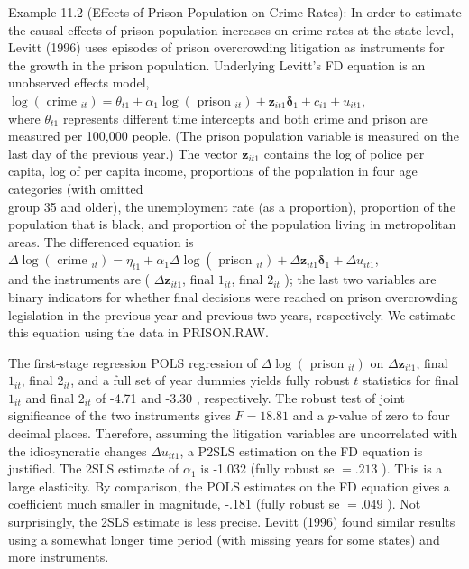 \documentclass[10pt]{article}
\begin{document}
Example 11.2 (Effects of Prison Population on Crime Rates): In order to estimate the causal effects of prison population increases on crime rates at the state level, Levitt (1996) uses episodes of prison overcrowding litigation as instruments for the growth in the prison population. Underlying Levitt's FD equation is an unobserved effects model,\\
$\log \left(\right.$ crime $\left._{i t}\right)=\theta_{t 1}+\alpha_{1} \log \left(\right.$ prison $\left._{i t}\right)+\mathbf{z}_{i t 1} \boldsymbol{\delta}_{1}+c_{i 1}+u_{i t 1}$,\\
where $\theta_{t 1}$ represents different time intercepts and both crime and prison are measured per 100,000 people. (The prison population variable is measured on the last day of the previous year.) The vector $\mathbf{z}_{i t 1}$ contains the log of police per capita, log of per capita income, proportions of the population in four age categories (with omitted\\
group 35 and older), the unemployment rate (as a proportion), proportion of the population that is black, and proportion of the population living in metropolitan areas. The differenced equation is\\
$\Delta \log \left(\right.$ crime $\left._{i t}\right)=\eta_{t 1}+\alpha_{1} \Delta \log \left(\right.$ prison $\left._{i t}\right)+\Delta \mathbf{z}_{i t 1} \boldsymbol{\delta}_{1}+\Delta u_{i t 1}$,\\
and the instruments are ( $\Delta \mathbf{z}_{i t 1}$, final $1_{i t}$, final $2_{i t}$ ); the last two variables are binary indicators for whether final decisions were reached on prison overcrowding legislation in the previous year and previous two years, respectively. We estimate this equation using the data in PRISON.RAW.

The first-stage regression POLS regression of $\Delta \log \left(\right.$ prison $\left._{i t}\right)$ on $\Delta \mathbf{z}_{i t 1}$, final $1_{i t}$, final $2_{i t}$, and a full set of year dummies yields fully robust $t$ statistics for final $1_{i t}$ and final $2_{i t}$ of -4.71 and -3.30 , respectively. The robust test of joint significance of the two instruments gives $F=18.81$ and a $p$-value of zero to four decimal places. Therefore, assuming the litigation variables are uncorrelated with the idiosyncratic changes $\Delta u_{i t 1}$, a P2SLS estimation on the FD equation is justified. The 2SLS estimate of $\alpha_{1}$ is -1.032 (fully robust se $=.213$ ). This is a large elasticity. By comparison, the POLS estimates on the FD equation gives a coefficient much smaller in magnitude, -.181 (fully robust se $=.049$ ). Not surprisingly, the 2SLS estimate is less precise. Levitt (1996) found similar results using a somewhat longer time period (with missing years for some states) and more instruments.
\end{document}
